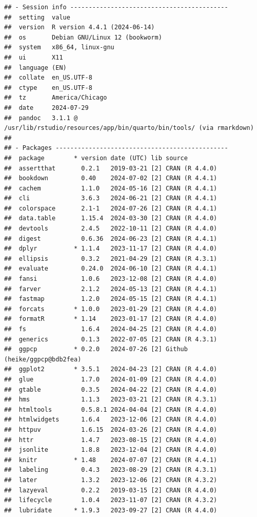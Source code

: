 \documentclass[print]{nuthesis}
\begin{document}
\begin{verbatim}
## - Session info -------------------------------------------
##  setting  value
##  version  R version 4.4.1 (2024-06-14)
##  os       Debian GNU/Linux 12 (bookworm)
##  system   x86_64, linux-gnu
##  ui       X11
##  language (EN)
##  collate  en_US.UTF-8
##  ctype    en_US.UTF-8
##  tz       America/Chicago
##  date     2024-07-29
##  pandoc   3.1.1 @ /usr/lib/rstudio/resources/app/bin/quarto/bin/tools/ (via rmarkdown)
## 
## - Packages -----------------------------------------------
##  package        * version date (UTC) lib source
##  assertthat       0.2.1   2019-03-21 [2] CRAN (R 4.4.0)
##  bookdown         0.40    2024-07-02 [2] CRAN (R 4.4.1)
##  cachem           1.1.0   2024-05-16 [2] CRAN (R 4.4.1)
##  cli              3.6.3   2024-06-21 [2] CRAN (R 4.4.1)
##  colorspace       2.1-1   2024-07-26 [2] CRAN (R 4.4.1)
##  data.table       1.15.4  2024-03-30 [2] CRAN (R 4.4.0)
##  devtools         2.4.5   2022-10-11 [2] CRAN (R 4.4.0)
##  digest           0.6.36  2024-06-23 [2] CRAN (R 4.4.1)
##  dplyr          * 1.1.4   2023-11-17 [2] CRAN (R 4.4.0)
##  ellipsis         0.3.2   2021-04-29 [2] CRAN (R 4.3.1)
##  evaluate         0.24.0  2024-06-10 [2] CRAN (R 4.4.1)
##  fansi            1.0.6   2023-12-08 [2] CRAN (R 4.4.0)
##  farver           2.1.2   2024-05-13 [2] CRAN (R 4.4.1)
##  fastmap          1.2.0   2024-05-15 [2] CRAN (R 4.4.1)
##  forcats        * 1.0.0   2023-01-29 [2] CRAN (R 4.4.0)
##  formatR        * 1.14    2023-01-17 [2] CRAN (R 4.4.0)
##  fs               1.6.4   2024-04-25 [2] CRAN (R 4.4.0)
##  generics         0.1.3   2022-07-05 [2] CRAN (R 4.3.1)
##  ggpcp          * 0.2.0   2024-07-26 [2] Github (heike/ggpcp@bdb2fea)
##  ggplot2        * 3.5.1   2024-04-23 [2] CRAN (R 4.4.0)
##  glue             1.7.0   2024-01-09 [2] CRAN (R 4.4.0)
##  gtable           0.3.5   2024-04-22 [2] CRAN (R 4.4.0)
##  hms              1.1.3   2023-03-21 [2] CRAN (R 4.3.1)
##  htmltools        0.5.8.1 2024-04-04 [2] CRAN (R 4.4.0)
##  htmlwidgets      1.6.4   2023-12-06 [2] CRAN (R 4.4.0)
##  httpuv           1.6.15  2024-03-26 [2] CRAN (R 4.4.0)
##  httr             1.4.7   2023-08-15 [2] CRAN (R 4.4.0)
##  jsonlite         1.8.8   2023-12-04 [2] CRAN (R 4.4.0)
##  knitr          * 1.48    2024-07-07 [2] CRAN (R 4.4.1)
##  labeling         0.4.3   2023-08-29 [2] CRAN (R 4.3.1)
##  later            1.3.2   2023-12-06 [2] CRAN (R 4.3.2)
##  lazyeval         0.2.2   2019-03-15 [2] CRAN (R 4.4.0)
##  lifecycle        1.0.4   2023-11-07 [2] CRAN (R 4.3.2)
##  lubridate      * 1.9.3   2023-09-27 [2] CRAN (R 4.4.0)

\end{verbatim}
\end{document}
